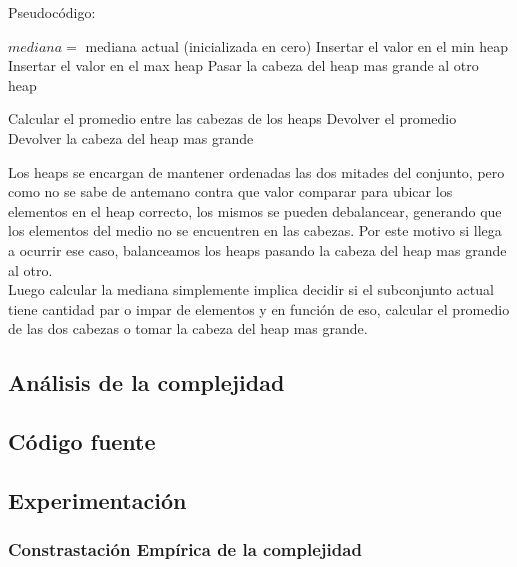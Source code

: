 Pseudocódigo:
\begin{algorithmic}
	\STATE $mediana =$ mediana actual (inicializada en cero)
			\STATE Insertar el valor en el min heap
		\ELSE
			\STATE Insertar el valor en el max heap
		\ENDIF
			\STATE Pasar la cabeza del heap mas grande al otro heap
		\ENDIF

			\STATE Calcular el promedio entre las cabezas de los heaps
			\STATE Devolver el promedio
		\ELSE
			\STATE Devolver la cabeza del heap mas grande
		\ENDIF
	\ENDFOR
\end{algorithmic}


Los heaps se encargan de mantener ordenadas las dos mitades del conjunto, pero como no se sabe de antemano contra que valor comparar para ubicar los elementos en el heap correcto, los mismos se pueden debalancear, generando que los elementos del medio no se encuentren en las cabezas. Por este motivo si llega a ocurrir ese caso, balanceamos los heaps pasando la cabeza del heap mas grande al otro.\\

Luego calcular la mediana simplemente implica decidir si el subconjunto actual tiene cantidad par o impar de elementos y en función de eso, calcular el promedio de las dos cabezas o tomar la cabeza del heap mas grande.
\subsection{Análisis de la complejidad}

\subsection{Código fuente}

\subsection{Experimentación}

\subsubsection{Constrastación Empírica de la complejidad}

